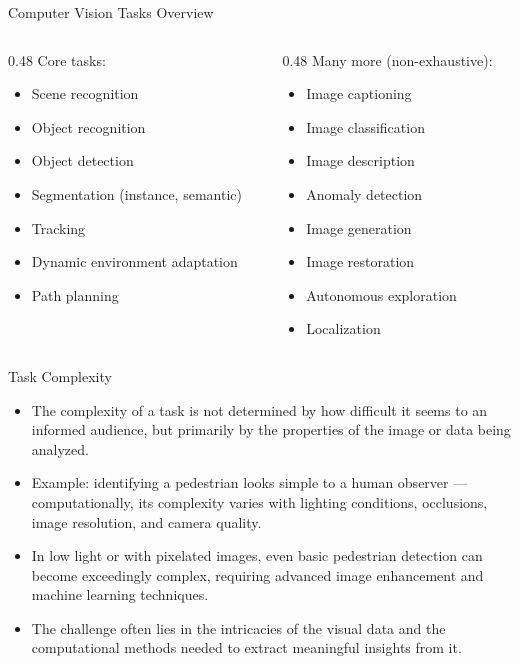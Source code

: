 \begin{frame}{Computer Vision Tasks Overview}
\begin{columns}[T]
\begin{column}{0.48\textwidth}
Core tasks:
\begin{itemize}
  \item Scene recognition
  \item Object recognition
  \item Object detection
  \item Segmentation (instance, semantic)
  \item Tracking
  \item Dynamic environment adaptation
  \item Path planning
\end{itemize}
\end{column}
\begin{column}{0.48\textwidth}
Many more (non-exhaustive):
\begin{itemize}
  \item Image captioning
  \item Image classification
  \item Image description
  \item Anomaly detection
  \item Image generation
  \item Image restoration
  \item Autonomous exploration
  \item Localization
\end{itemize}
\end{column}
\end{columns}
\end{frame}

\begin{frame}{Task Complexity}
\begin{itemize}
  \item The complexity of a task is not determined by how difficult it seems to an informed audience, but primarily by the properties of the image or data being analyzed.
  \item Example: identifying a pedestrian looks simple to a human observer --- computationally, its complexity varies with lighting conditions, occlusions, image resolution, and camera quality.
  \item In low light or with pixelated images, even basic pedestrian detection can become exceedingly complex, requiring advanced image enhancement and machine learning techniques.
  \item The challenge often lies in the intricacies of the visual data and the computational methods needed to extract meaningful insights from it.
\end{itemize}
\end{frame}

